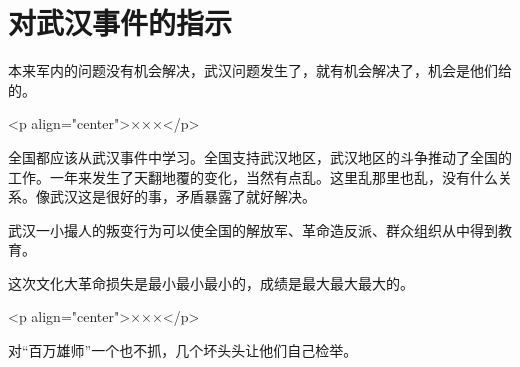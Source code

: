 \section[对武汉事件的指示（一九六七年七月）]{对武汉事件的指示}


本来军内的问题没有机会解决，武汉问题发生了，就有机会解决了，机会是他们给的。

<p align="center">×××</p>

全国都应该从武汉事件中学习。全国支持武汉地区，武汉地区的斗争推动了全国的工作。一年来发生了天翻地覆的变化，当然有点乱。这里乱那里也乱，没有什么关系。像武汉这是很好的事，矛盾暴露了就好解决。

武汉一小撮人的叛变行为可以使全国的解放军、革命造反派、群众组织从中得到教育。

这次文化大革命损失是最小最小最小的，成绩是最大最大最大的。

<p align="center">×××</p>

对“百万雄师”一个也不抓，几个坏头头让他们自己检举。


